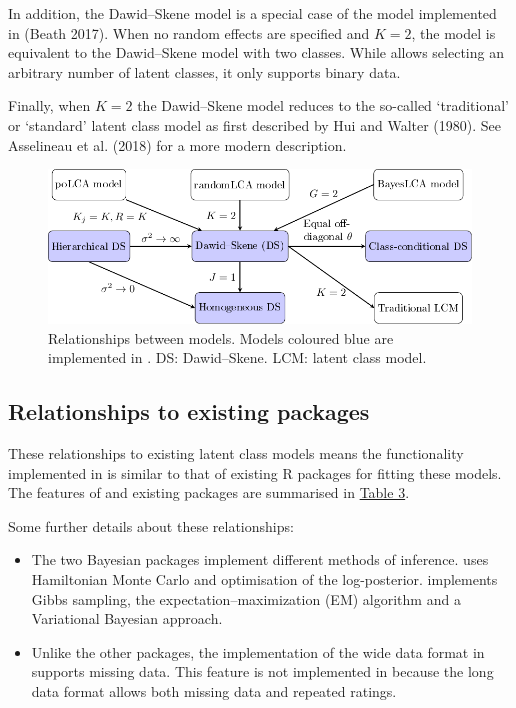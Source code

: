 In addition, the Dawid--Skene model is a special case of the model
implemented in  (Beath 2017). When no random effects are
specified and \(K = 2\), the model is equivalent to the Dawid--Skene model with
two classes. While  allows
selecting an arbitrary number of latent classes, it only supports binary
data.

Finally, when \(K = 2\) the Dawid--Skene model reduces to the so-called
`traditional' or `standard' latent class model as first described by
Hui and Walter (1980). See Asselineau et al. (2018) for a more modern description.



\begin{figure}
\includegraphics[width=1\linewidth]{tikz/figrelationships} \caption{Relationships between models. Models coloured blue are implemented in . DS: Dawid–Skene. LCM: latent class model.}\label{fig:relationships}
\end{figure}

\hypertarget{sec:relationships-existing-packages}{%
\subsection{Relationships to existing packages}\label{sec:relationships-existing-packages}}

These relationships to existing latent class models means the
functionality implemented in  is similar to that
of existing R packages for fitting these models. The features of
 and existing packages are summarised in \protect\hyperlink{tab:package-features}{Table 3}.

Some further details about these relationships:

\begin{itemize}
\item
  The two Bayesian packages implement different methods of inference.
   uses Hamiltonian
  Monte Carlo and optimisation of the log-posterior. 
  implements Gibbs sampling, the expectation--maximization (EM) algorithm and a
  Variational Bayesian approach.
\item
  Unlike the other packages, the implementation of the wide data
  format in  supports missing data. This feature is not
  implemented in  because the long
  data format allows both missing data and repeated ratings.
\end{itemize}

